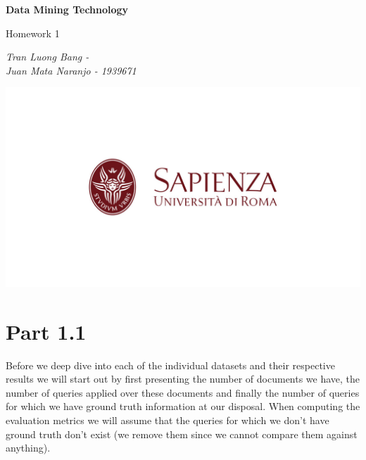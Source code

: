 \documentclass[10pt]{article}
\begin{document}
\begin{titlepage}
    \begin{center}
        \vspace*{3cm}
            
        \Huge
        \textbf{Data Mining Technology}
            
        \vspace{0.5cm}
        \LARGE
        Homework 1
            
        \vspace{1.5cm}
            
        \textit{Tran Luong Bang -  \\ Juan Mata Naranjo - 1939671}
            
            
        \vspace{0.8cm}
            
        \includegraphics[width=1\textwidth]{sapienza.png}
            
    \end{center}
\end{titlepage}


\section{Part 1.1}

Before we deep dive into each of the individual datasets and their respective results we will start out by first presenting the number of documents we have, the number of queries applied over these documents and finally the number of queries for which we have ground truth information at our disposal. When computing the evaluation metrics we will assume that the queries for which we don't have ground truth don't exist (we remove them since we cannot compare them against anything).
\end{document}
